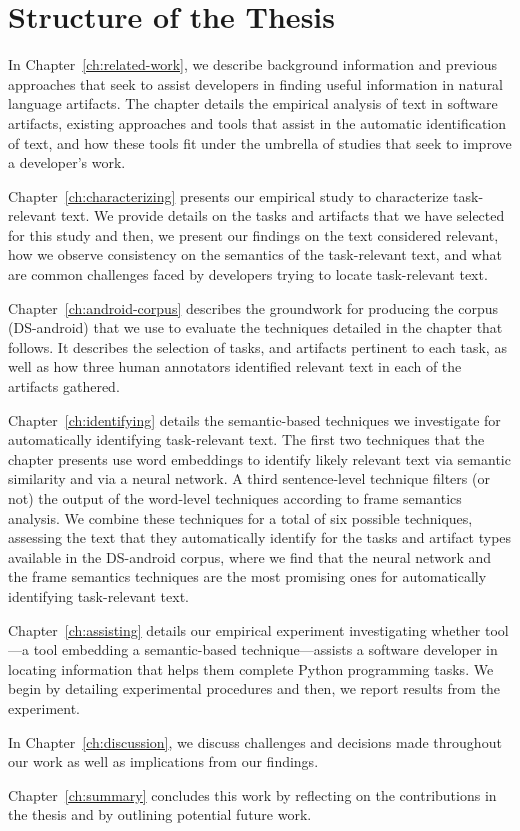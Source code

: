 \section{Structure of the Thesis}
\label{cp1:organization}


In Chapter~\ref{ch:related-work}, we describe background information 
and previous approaches that seek to assist developers in 
finding useful information in natural language artifacts. 
The chapter details 
the empirical analysis of text in software artifacts, existing approaches and tools 
that assist in the automatic
identification of text, and how these tools fit under the 
umbrella of studies that seek to 
improve a developer's work.


Chapter~\ref{ch:characterizing} presents our empirical study to characterize task-relevant text.
We provide details on the tasks and artifacts that we have selected for this study
and then, we present our findings on the text considered relevant, 
how we observe consistency on the semantics of the task-relevant text,
and what are common challenges faced by developers trying to locate task-relevant text.


Chapter~\ref{ch:android-corpus} describes the groundwork 
for producing the corpus (\acs{DS-android}) that we use to evaluate the techniques 
detailed in the chapter that follows. It describes the selection of tasks, 
and 
artifacts pertinent to each task,
as well as how three human annotators identified relevant text in each of the artifacts gathered.



Chapter~\ref{ch:identifying} details the semantic-based techniques we investigate for automatically 
identifying task-relevant text.
The first two techniques that the chapter presents 
use word embeddings to identify likely relevant text via semantic similarity
and via a neural network.
A third sentence-level technique filters (or not) 
the output of the word-level techniques according to frame semantics analysis.
We combine these techniques for a total of six possible techniques, 
assessing 
the text that they automatically identify for the tasks and artifact types
available in the \acs{DS-android} corpus,
where we find that the neural network and the frame semantics techniques
are the most promising ones for automatically identifying 
task-relevant text. 




Chapter~\ref{ch:assisting} details our empirical experiment investigating 
whether \acs{tool}---a tool embedding a semantic-based technique---assists a software developer in locating information
that helps them complete Python programming tasks. We begin by detailing experimental procedures
and then, we report results from the experiment.


In Chapter~\ref{ch:discussion}, we discuss challenges and decisions 
made throughout our work 
as well as implications from our findings. 


Chapter~\ref{ch:summary} concludes this work by reflecting on the contributions in the thesis
and by outlining  potential future work. 
